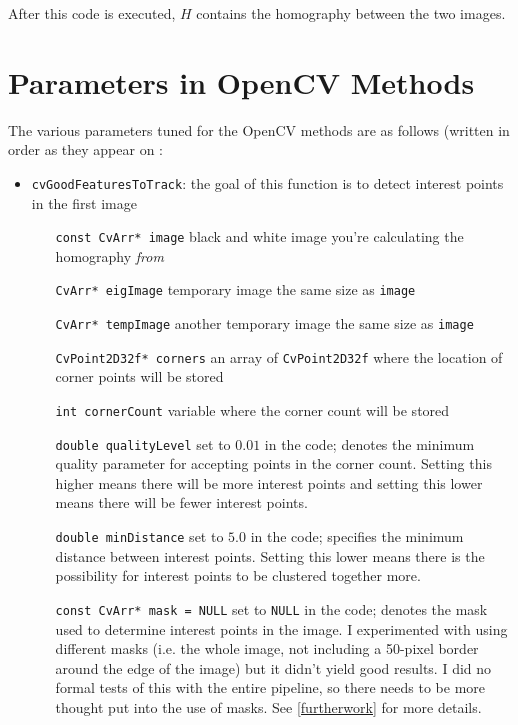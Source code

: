 \documentclass{article}
\begin{document}
After this code is executed, $H$ contains the homography between the two
images. 

\section{Parameters in OpenCV Methods}
\label{apdx:params}

The various parameters tuned for the OpenCV methods are as follows (written in order as they appear on \cite{cvhomogs, points}:

\begin{itemize}

\item \verb|cvGoodFeaturesToTrack|: the goal of this function is to detect
interest points in the first image

\begin{itemize}

\item[\texttt{const CvArr* image}] black and white image you're calculating the
homography \textit{from}

\item[\texttt{CvArr* eigImage}] temporary image the same size as \texttt{image}

\item[\texttt{CvArr* tempImage}] another temporary image the same size as
\texttt{image}

\item[\texttt{CvPoint2D32f* corners}] an array of \texttt{CvPoint2D32f} where
the location of corner points will be stored

\item[\texttt{int cornerCount}] variable where the corner count will be stored

\item[\texttt{double qualityLevel}] set to $0.01$ in the code; denotes the
minimum quality parameter for accepting points in the corner count. Setting
this higher means there will be more interest points and setting this lower
means there will be fewer interest points. 

\item[\texttt{double minDistance}] set to $5.0$ in the code; specifies the
minimum distance between interest points. Setting this lower means there is
the possibility for interest points to be clustered together more.

\item[\texttt{const CvArr* mask = NULL}] set to \texttt{NULL} in the code;
denotes the mask used to determine interest points in the image. I experimented
with using different masks (i.e. the whole image, not including a 50-pixel
border around the edge of the image) but it didn't yield good results. I did no
formal tests of this with the entire pipeline, so there needs to be more
thought put into the use of masks. See \ref{furtherwork} for more details.    


\end{itemize}
\end{itemize}
\end{document}
